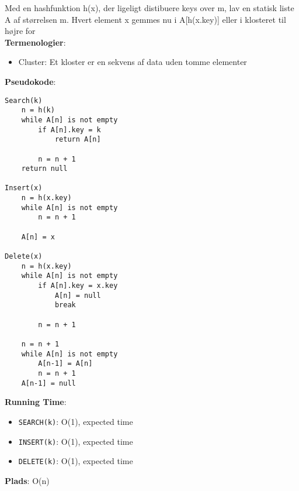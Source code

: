 Med en hashfunktion h(x), der ligeligt distibuere keys over m, lav en statisk liste A af størrelsen m. Hvert element x gemmes nu i A[h(x.key)] eller i klosteret til højre for\\
\textbf{Termenologier}:
\begin{itemize}
	\item Cluster: Et kloster er en sekvens af data uden tomme elementer
\end{itemize}
\textbf{Pseudokode}:
\begin{lstlisting}[frame=single, mathescape=true]
Search(k)
	n = h(k)
	while A[n] is not empty
		if A[n].key = k
			return A[n]
		
		n = n + 1
	return null

Insert(x)
	n = h(x.key)
	while A[n] is not empty
		n = n + 1
	
	A[n] = x

Delete(x)
	n = h(x.key)
	while A[n] is not empty
		if A[n].key = x.key
			A[n] = null
			break
		
		n = n + 1

	n = n + 1
	while A[n] is not empty
		A[n-1] = A[n]
		n = n + 1
	A[n-1] = null
\end{lstlisting}
\textbf{Running Time}:
\begin{itemize}
	\item \texttt{SEARCH(k)}: O(1), expected time
	\item \texttt{INSERT(k)}: O(1), expected time
	\item \texttt{DELETE(k)}: O(1), expected time
\end{itemize}
\textbf{Plads}: O(n)